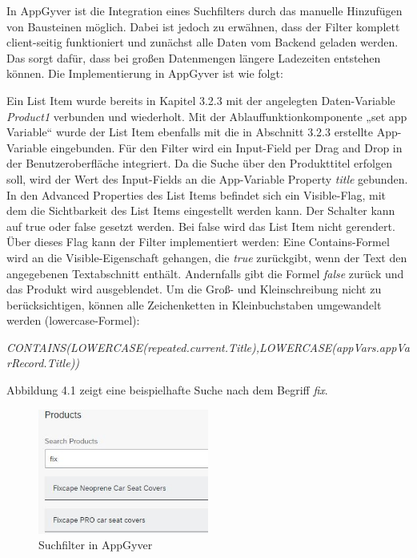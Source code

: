 In AppGyver ist die Integration eines Suchfilters durch das manuelle Hinzufügen von Bausteinen möglich. Dabei ist jedoch zu erwähnen, dass der Filter komplett client-seitig funktioniert und zunächst alle Daten vom Backend geladen werden. Das sorgt dafür, dass bei großen Datenmengen längere Ladezeiten entstehen können. Die Implementierung in AppGyver ist wie folgt:

Ein List Item wurde bereits in Kapitel 3.2.3 mit der angelegten Daten-Variable \textit{Product1} verbunden und wiederholt. Mit der Ablauffunktionkomponente „set app Variable“ wurde der List Item ebenfalls mit die in Abschnitt 3.2.3 erstellte App-Variable eingebunden. Für den Filter wird ein Input-Field per Drag and Drop in der Benutzeroberfläche integriert. Da die Suche über den Produkttitel erfolgen soll, wird der Wert des Input-Fields an die App-Variable Property \textit{title} gebunden. In den Advanced Properties des List Items befindet sich ein Visible-Flag, mit dem die Sichtbarkeit des List Items eingestellt werden kann. Der Schalter kann auf true oder false gesetzt werden. Bei false wird das List Item nicht gerendert. Über dieses Flag kann der Filter implementiert werden: Eine Contains-Formel wird an die Visible-Eigenschaft gehangen, die \textit{true} zurückgibt, wenn der Text den angegebenen Textabschnitt enthält. Andernfalls gibt die Formel \textit{false} zurück und das Produkt wird ausgeblendet. Um die Groß- und Kleinschreibung nicht zu berücksichtigen, können alle Zeichenketten in Kleinbuchstaben umgewandelt werden (lowercase-Formel):

\textit{\scriptsize CONTAINS(LOWERCASE(repeated.current.Title),LOWERCASE(appVars.appVarRecord.Title))}


Abbildung 4.1 zeigt eine beispielhafte  Suche nach dem Begriff \textit{fix}.
\begin{figure}[htbp]
 \centering
 \includegraphics[width=0.5\textwidth]{Bilder/appgyver/4_1_Suchfilter_in_AppGyver.jpg}
 \caption{Suchfilter in AppGyver}
\end{figure}


